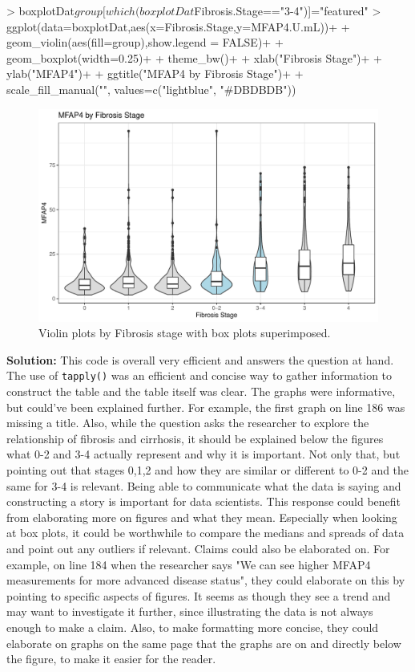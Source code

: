 \documentclass{article}
\begin{document}
\begin{enumerate}
\begin{enumerate}
\begin{enumerate}
\begin{Schunk}
\begin{Sinput}
> boxplotDat$group[which(boxplotDat$Fibrosis.Stage=="3-4")]="featured"
> ggplot(data=boxplotDat,aes(x=Fibrosis.Stage,y=MFAP4.U.mL))+
+   geom_violin(aes(fill=group),show.legend = FALSE)+
+   geom_boxplot(width=0.25)+
+   theme_bw()+
+   xlab("Fibrosis Stage")+
+   ylab("MFAP4")+
+   ggtitle("MFAP4 by Fibrosis Stage")+
+   scale_fill_manual("", values=c("lightblue", "#DBDBDB"))
\end{Sinput}
\end{Schunk}
        \begin{figure}[H]
        \centering
\includegraphics{finalExam-006}
        \caption{Violin plots by Fibrosis stage with box plots superimposed.}\label{MFAP4gg}
        \end{figure}
  \end{enumerate}
\end{enumerate}
\textbf{Solution:}
\newline
This code is overall very efficient and answers the question at hand. The use of \texttt{tapply()} was an efficient and concise way to gather information to construct the table and the table itself was clear. The graphs were informative, but could've been explained further. For example, the first graph on line 186 was missing a title. Also, while the question asks the researcher to explore the relationship of fibrosis and cirrhosis, it should be explained below the figures what 0-2 and 3-4 actually represent and why it is important. Not only that, but pointing out that stages 0,1,2 and how they are similar or different to 0-2 and the same for 3-4 is relevant. Being able to communicate what the data is saying and constructing a story is important for data scientists. This response could benefit from elaborating more on figures and what they mean. Especially when looking at box plots, it could be worthwhile to compare the medians and spreads of data and point out any outliers if relevant. Claims could also be elaborated on. For example, on line 184 when the researcher says "We can see higher MFAP4 measurements for more advanced disease status", they could elaborate on this by pointing to specific aspects of figures. It seems as though they see a trend and may want to investigate it further, since illustrating the data is not always enough to make a claim. Also, to make formatting more concise, they could elaborate on graphs on the same page that the graphs are on and directly below the figure, to make it easier for the reader. 

\end{enumerate}
\end{document}

